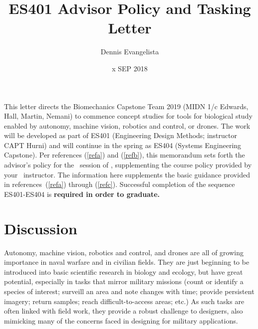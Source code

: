 \documentclass[10pt,courier]{navymemo}
\author{Dennis Evangelista}
\title{ES401 Advisor Policy and Tasking Letter}
\date{x SEP 2018}
\begin{document}
\makedateblock{}

\MEMORANDUM{}

\begin{navyletterheader}
\navyskip{}%

\navysubjline{}%
\navyskip{}%
\end{navyletterheader}

\section{} This letter directs the Biomechanics Capstone Team 2019 (MIDN 1/c Edwards, Hall, Martin, Nemani) to commence concept studies for tools for biological study enabled by autonomy, machine vision, robotics and control, or drones. The work will be developed as part of ES401 (Engineering Design Methods; instructor CAPT Hurni) and will continue in the spring as ES404 (Systems Engineering Capstone).  Per references (\ref{refa}) and (\ref{refb}), this memorandum sets forth the advisor's policy for the \courseTerm\ session of \usnaCourseNumber, supplementing the course policy provided by your \usnaCourseNumber\ instructor.  The information here supplements the basic guidance provided in references~(\ref{refa}) through (\ref{refc}).  Successful completion of the sequence ES401-ES404 is \textbf{required in order to graduate.}

\section{Discussion} Autonomy, machine vision, robotics and control, and drones are all of growing importance in naval warfare and in civilian fields. They are just beginning to be introduced into basic scientific research in biology and ecology, but have great potential, especially in tasks that mirror military missions (count or identify a species of interest; surveill an area and note changes with time; provide persistent imagery; return samples; reach difficult-to-access areas; etc.) As such tasks are often linked with field work, they provide a robust challenge to designers, also mimicking many of the concerns faced in designing for military applications.
\end{document}
